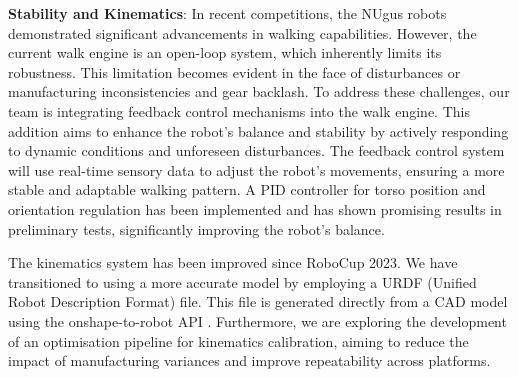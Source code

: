 \documentclass{llncs}
\begin{document}
\noindent\textbf{Stability and Kinematics}:
In recent competitions, the NUgus robots demonstrated significant advancements in walking capabilities. However, the current walk engine is an open-loop system, which inherently limits its robustness. This limitation becomes evident in the face of disturbances or manufacturing inconsistencies and gear backlash. To address these challenges, our team is integrating feedback control mechanisms into the walk engine. This addition aims to enhance the robot's balance and stability by actively responding to dynamic conditions and unforeseen disturbances. The feedback control system will use real-time sensory data to adjust the robot's movements, ensuring a more stable and adaptable walking pattern. A PID controller for torso position and orientation regulation has been implemented and has shown promising results in preliminary tests, significantly improving the robot's balance.

The kinematics system has been improved since RoboCup 2023. We have transitioned to using a more accurate model by employing a URDF (Unified Robot Description Format) file. This file is generated directly from a CAD model using the onshape-to-robot API \cite{onshapetorobot}. Furthermore, we are exploring the development of an optimisation pipeline for kinematics calibration, aiming to reduce the impact of manufacturing variances and improve repeatability across platforms.



\end{document}
